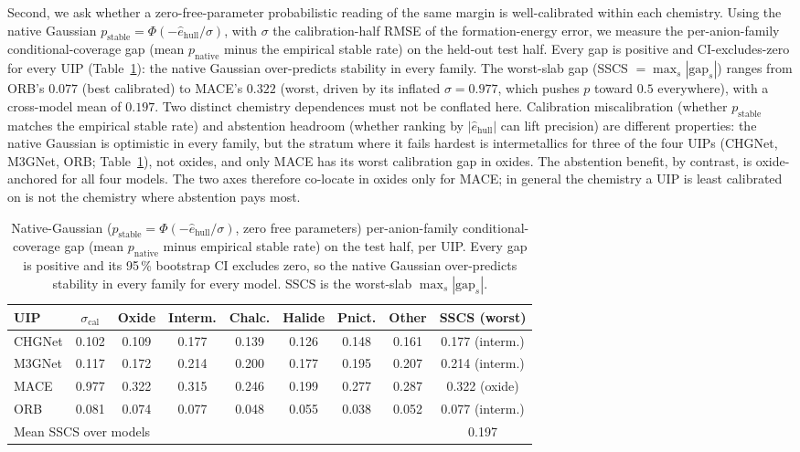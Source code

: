 \documentclass[11pt]{article}
\begin{document}
Second, we ask whether a zero-free-parameter probabilistic reading of the same margin is
well-calibrated within each chemistry. Using the native Gaussian
$p_{\mathrm{stable}} = \Phi(-\hat{e}_{\mathrm{hull}}/\sigma)$, with $\sigma$ the
calibration-half RMSE of the formation-energy error, we measure the per-anion-family
conditional-coverage gap (mean $p_{\mathrm{native}}$ minus the empirical stable rate) on the
held-out test half. Every gap is positive and CI-excludes-zero for every UIP
(Table~\ref{tab:sscs}): the native Gaussian over-predicts stability in every family. The
worst-slab gap (SSCS $= \max_s |\mathrm{gap}_s|$) ranges from ORB's $0.077$ (best calibrated)
to MACE's $0.322$ (worst, driven by its inflated $\sigma = 0.977$, which pushes $p$ toward
$0.5$ everywhere), with a cross-model mean of $0.197$. Two distinct chemistry dependences must
not be conflated here. Calibration miscalibration (whether $p_{\mathrm{stable}}$ matches the
empirical stable rate) and abstention headroom (whether ranking by $|\hat{e}_{\mathrm{hull}}|$
can lift precision) are different properties: the native Gaussian is optimistic in every family,
but the stratum where it fails hardest is intermetallics for three of the four
UIPs (CHGNet, M3GNet, ORB; Table~\ref{tab:sscs}), not oxides, and only MACE has its worst
calibration gap in oxides. The abstention benefit, by contrast, is oxide-anchored for all four
models. The two axes therefore co-locate in oxides only for MACE; in general the chemistry a
UIP is least calibrated on is not the chemistry where abstention pays most.

\begin{table}[t]
  \centering
  \caption{Native-Gaussian ($p_{\mathrm{stable}} = \Phi(-\hat{e}_{\mathrm{hull}}/\sigma)$,
  zero free parameters) per-anion-family conditional-coverage gap (mean $p_{\mathrm{native}}$
  minus empirical stable rate) on the test half, per UIP. Every gap is positive and its
  95\,\% bootstrap CI excludes zero, so the native Gaussian over-predicts stability in every
  family for every model. SSCS is the worst-slab $\max_s |\mathrm{gap}_s|$.}
  \label{tab:sscs}
  \begin{tabular}{lcccccccc}
    \toprule
    UIP & $\sigma_{\mathrm{cal}}$ & Oxide & Interm. & Chalc. & Halide & Pnict. & Other & SSCS (worst) \\
    \midrule
    CHGNet & 0.102 & 0.109 & 0.177 & 0.139 & 0.126 & 0.148 & 0.161 & 0.177 (interm.) \\
    M3GNet & 0.117 & 0.172 & 0.214 & 0.200 & 0.177 & 0.195 & 0.207 & 0.214 (interm.) \\
    MACE   & 0.977 & 0.322 & 0.315 & 0.246 & 0.199 & 0.277 & 0.287 & 0.322 (oxide) \\
    ORB    & 0.081 & 0.074 & 0.077 & 0.048 & 0.055 & 0.038 & 0.052 & 0.077 (interm.) \\
    \midrule
    \multicolumn{8}{l}{Mean SSCS over models} & 0.197 \\
    \bottomrule
  \end{tabular}
\end{table}
\end{document}
